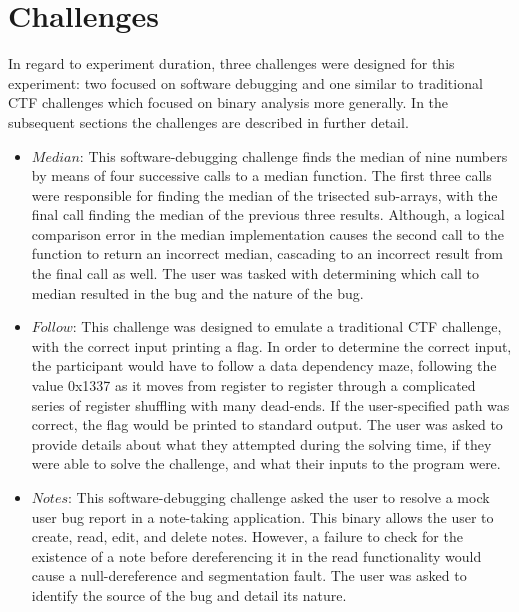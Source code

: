 \section{Challenges}
In regard to experiment duration, three challenges were designed for this experiment: two focused on software debugging and one similar to traditional CTF challenges which focused on binary analysis more generally. In the subsequent sections the challenges are described in further detail.
\begin{itemize}
    \item $Median$: This software-debugging challenge finds the median of nine numbers by means of four successive calls to a median function. The first three calls were responsible for finding the median of the trisected sub-arrays, with the final call finding the median of the previous three results. Although, a logical comparison error in the median implementation causes the second call to the function to return an incorrect median, cascading to an incorrect result from the final call as well. The user was tasked with determining which call to median resulted in the bug and the nature of the bug. 
    \item $Follow$: This challenge was designed to emulate a traditional CTF challenge, with the correct input printing a flag. In order to determine the correct input, the participant would have to follow a data dependency maze, following the value 0x1337 as it moves from register  to register  through a complicated series of register shuffling with many dead-ends. If the user-specified path was correct, the flag would be printed to standard output. The user was asked to provide details about what they attempted during the solving time, if they were able to solve the challenge, and what their inputs to the program were. 
    \item $Notes$: This software-debugging challenge asked the user to resolve a mock user bug report in a note-taking application. This binary allows the user to create, read, edit, and delete notes. However, a failure to check for the existence of a note before dereferencing it in the read functionality would cause a null-dereference and segmentation fault. The user was asked to identify the source of the bug and detail its nature.
\end{itemize}

